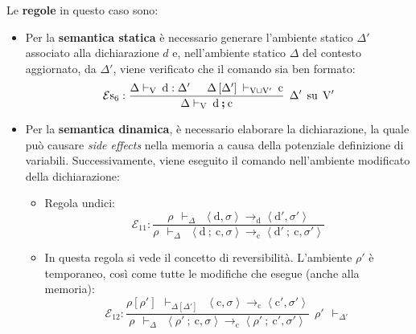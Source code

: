 \documentclass[a4paper]{article}
\begin{document}
 	\noindent
 	Le \textbf{regole} in questo caso sono:
 	\begin{itemize}
 		\item Per la \textbf{semantica statica} è necessario generare l'ambiente statico $\Delta'$ associato alla dichiarazione $d$ e, nell'ambiente statico $\Delta$ del contesto aggiornato, da $\Delta'$, viene verificato che il comando sia ben formato:
 		\begin{equation*}
 			\mathcal{E}\mathrm{s}_{6} : \dfrac{
 				\Delta\vdash_{\mathrm{V}} \: \mathrm{d}:\Delta' \hspace{1.5em} \Delta\left[\Delta'\right] \: \vdash_{\mathrm{V} \cup \mathrm{V}'} \: \mathrm{c}
 			}{
 				\Delta\vdash_{\mathrm{V}} \: \mathrm{d} \: \boldsymbol{;} \: \mathrm{c}
 			} \:\: \Delta' \:\: \text{su} \:\: \mathrm{V}'
 		\end{equation*}
 		
 		\item Per la \textbf{semantica dinamica}, è necessario elaborare la dichiarazione, la quale può causare \emph{side effects} nella memoria a causa della potenziale definizione di variabili. Successivamente, viene eseguito il comando nell'ambiente modificato della dichiarazione:
 		\begin{itemize}
 			\item Regola undici:
 			\begin{equation*}
 				\mathcal{E}_{11}: \dfrac{
 					\rho \:\: \vdash_{\Delta} \:\: \left\langle \mathrm{d}, \sigma \right\rangle \rightarrow_{\mathrm{d}} \left\langle \mathrm{d}', \sigma' \right\rangle
 				}{
 					\rho \:\: \vdash_{\Delta} \:\: \left\langle \mathrm{d} \: \mathbf{;} \: \mathrm{c}, \sigma \right\rangle \rightarrow_{\mathrm{c}} \left\langle \mathrm{d}' \: \boldsymbol{;} \: \mathrm{c}, \sigma' \right\rangle
 				}
 			\end{equation*}
 			
 			\item In questa regola si vede il concetto di reversibilità. L'ambiente $\rho'$ è temporaneo, così come tutte le modifiche che esegue (anche alla memoria):
 			\begin{equation*}
 				\mathcal{E}_{12} : \dfrac{
 					\rho\left[\rho'\right] \:\: \vdash_{\Delta\left[\Delta'\right]} \:\: \left\langle \mathrm{c}, \sigma \right\rangle \rightarrow_{\mathrm{c}} \left\langle \mathrm{c}', \sigma' \right\rangle
 				}{
 					\rho \:\: \vdash_{\Delta} \:\: \left\langle \rho' \: \mathbf{;} \: \mathrm{c}, \sigma \right\rangle \rightarrow_{\mathrm{c}} \left\langle \rho' \: \boldsymbol{;} \: \mathrm{c}', \sigma' \right\rangle
 				} \:\: \rho' \:\: \vdash_{\Delta'}
 			\end{equation*}
 			

\end{itemize}
\end{itemize}
\end{document}
